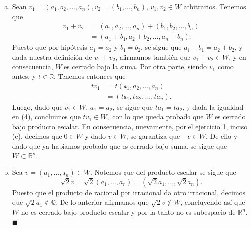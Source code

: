 \documentclass[11pt]{scrartcl}
\begin{document}
\begin{enumerate}[a)]
\begin{align*}
        \end{align*}
        Ahora, multiplicando la primera igualdad de (1) por $t$, de la distributividad y conmutatividad en $\mathbb{R}$ se tiene que
        \begin{align*}
            ta_3&=t(a_1+3a_2) \\
            &=ta_1+t3a_2 \\
            &=ta_1+3(ta_2),
        \end{align*}
        y puesto que de (3) sabemos que $z_1+3z_2=ta_1+3(ta_2)$ y $ta_3=z_3$, decimos que $z_1+3z_2=z_3$, probando así que $tv_1\in W$. De ello, puesto que, por el ejercicio $1$, $(-1)v=v$ y $0v=0$,
        se sigue que $0 \in W$ y para todo $v \in W,$ $-v \in W$, concluyendo así que $W\subset R^n.$
        \item Sean $v_1=(a_1,a_2,...,a_n),v_2=(b_1,...,b_n)$, $v_1,v_2 \in W$ arbitrarios. Tenemos que
        \begin{align*}
            v_1+v_2&=(a_1,a_2,...,a_n)+(b_1,b_2,...,b_n) \\
            &=(a_1+b_1,a_2+b_2,...,a_n+b_n).
        \end{align*}
        Puesto que por hipótesis $a_1=a_2$ y $b_1=b_2$, se sigue que $a_1+b_1=a_2+b_2$, y dada nuestra definición de $v_1+v_2$, afirmamos también que
        $v_1+v_2\in W$, y en consecuencia, $W$ es cerrado bajo la suma. Por otra parte, siendo $v_1$ como antes, y $t\in \mathbb{R}$. Tenemos entonces que
        \begin{align*}
            tv_1&=t(a_1,a_2,...,a_n) \\
            &=(ta_1,ta_2,...,ta_n). \tag{4}
        \end{align*}
        Luego, dado que $v_1 \in W$, $a_1=a_2$, se sigue que $ta_1=ta_2$, y dada la igualdad en (4), concluimos que $tv_1\in W,$ con lo que queda probado que $W$ es cerrado bajo producto escalar. En consecuencia,
        nuevamente, por el ejercicio 1, inciso (c), decimos que $0 \in W$ y dado $v \in W$, se garantiza que $-v\in W$.
        De ello y dado que ya habíamos probado que es cerrado bajo suma, se sigue que $W\subset \mathbb{R}^n$.
        \item Sea $v=(a_1,...,a_n)\in W$. Notemos que del producto escalar se sigue que
        \[
        \sqrt{2}v=\sqrt{2}(a_1,...,a_n)=\left(\sqrt{2}a_1,...,\sqrt{2}a_n\right).
        \]
        Puesto que el producto de racional por irracional da otro irracional, decimos que $\sqrt{2}a_1 \notin \mathbb{Q}$.
        De lo anterior afirmamos que $\sqrt{2}v\notin W$, concluyendo así que $W$ no es cerrado bajo producto escalar y por la tanto no es subespacio de $\mathbb{R}^n$. $\blacksquare$
    \end{enumerate}
\end{document}
